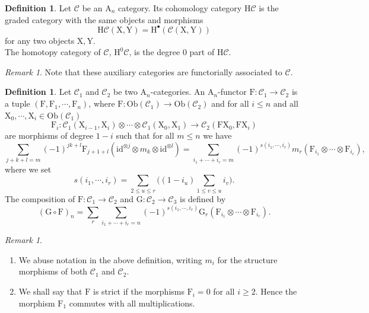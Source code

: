 \documentclass{article}
\theoremstyle{plain}
\theoremstyle{definition}
\newtheorem{definition}[theorem]{Definition}
\theoremstyle{remark}
\newtheorem{remark}[theorem]{Remark}
\newcommand{\mr}{\mathrm}
\newcommand{\3}{\vspace{3mm}}
\newcommand{\2}{\vspace{2mm}}
\newcommand{\1}{\vspace{1mm}}
\begin{document}
\2 
\begin{definition}
Let $\mathcal{C}$ be an $\mr{A}_n$ category. Its cohomology category $\mr{H}\mathcal{C}$ is the graded category with the same objects and morphisms $$\mr{H}\mathcal{C}(\mr{X,Y}) = \mr{H}^{\bullet}(\mathcal{C}(\mr{X,Y}))$$ for any two objects $\mr{X,Y}$.\\
The homotopy category of $\mathcal{C}$, $\mr{H}^0\mathcal{C}$, is the degree $0$ part of $\mr{H}\mathcal{C}$.
\end{definition}
\2
\begin{remark}
Note that these auxiliary categories are functorially associated to $\mathcal{C}$.
\end{remark}
\2
\begin{definition}
Let $\mathscr{C}_1$ and $\mathcal{C}_2$ be two $\mr{A}_n$-categories. An $\mr{A}_n$-functor $\mr{F}:\mathcal{C}_1\to \mathcal{C}_2$ is a tuple $(\mr{F},\mr{F}_1,\cdots,\mr{F}_n)$, where $\mr{F}:\mr{Ob}(\mathcal{C}_1)\to \mr{Ob}(\mathcal{C}_2)$ and for all $i\le n$ and all $\mr{X}_0,\cdots,\mr{X}_i \in \mr{Ob}(\mathcal{C}_1)$ $$\mr{F}_i:\mathcal{C}_1(\mr{X}_{i-1},\mr{X}_{i})\otimes\cdots\otimes \mathcal{C}_1(\mr{X}_0,\mr{X}_1)\to \mathcal{C}_2(\mr{F}\mr{X}_0,\mr{F}\mr{X}_i)$$ are morphisms of degree $1-i$ such that for all $m\le n$ we have \begin{equation}\label{defeq2cat}\tag{$**_m$}
 \sum_{j+k+l=m} (-1)^{jk+l}\mr{F}_{j+1+l}(\mr{id}^{\otimes j}\otimes m_{k}\otimes \mr{id}^{\otimes l}) =  \sum_{i_{1}+\cdots +i_{r}=m}(-1)^{s(i_1,\cdots,i_r)}m_{r}(\mr{F}_{i_1}\otimes \cdots \otimes \mr{F}_{i_r}),                                                                                                                                                                                                                                                                                                                                                      \end{equation}
 where we set $$s(i_1,\cdots,i_r) = \sum_{2\le u\le r}\big((1-i_u)\sum_{1\le v \le u} i_v\big).$$
The composition of $\mr{F} : \mathcal{C}_1 \to \mathcal{C}_2$ and $\mr{G} : \mathcal{C}_2 \to \mathcal{C}_3$ is defined by $$(\mr{G} \circ \mr{F})_n = \sum_r \sum_{i_1 +\cdots+i_r=n} (-1)^{s(i_1,\cdots,i_r)}\mr{G}_{r}(\mr{F}_{i_{1}}\otimes \cdots \otimes \mr{F}_{i_{r}}).$$
\end{definition}
\2 
\begin{remark}
\begin{enumerate}
\item We abuse notation in the above definition, writing $m_i$ for the structure morphisms of both $\mathcal{C}_1$ and $\mathcal{C}_2$.
\item We shall say that $\mr{F}$ is strict if the morphisms $\mr{F}_i=0$ for all $i\ge 2$. Hence the morphism $\mr{F}_1$ commutes with all multiplications.
\end{enumerate}
\end{remark}
\end{document}
